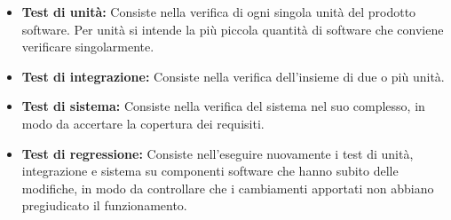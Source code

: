 \begin{itemize}
\item \textbf{Test di unità:} Consiste nella verifica di ogni singola unità del prodotto software. Per unità si intende la più piccola quantità di software che conviene verificare singolarmente.
\item \textbf{Test di integrazione:} Consiste nella verifica dell'insieme di due o più unità.
\item \textbf{Test di sistema:} Consiste nella verifica del sistema nel suo complesso, in modo da accertare la copertura dei requisiti.
\item \textbf{Test di regressione:} Consiste nell'eseguire nuovamente i test di unità, integrazione e sistema su componenti software che hanno subito delle modifiche, in modo da controllare che i cambiamenti apportati non abbiano pregiudicato il funzionamento.
\end{itemize}
